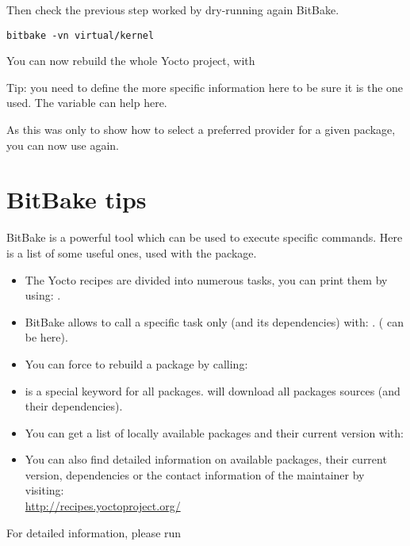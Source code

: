 Then check the previous step worked by dry-running again BitBake.
\begin{verbatim}
bitbake -vn virtual/kernel
\end{verbatim}

You can now rebuild the whole Yocto project, with 

Tip: you need to define the more specific information here to be sure it is the
one used. The  variable can help here.

As this was only to show how to select a preferred provider for a
given package, you can now use  again.

\section{BitBake tips}

BitBake is a powerful tool which can be used to execute specific commands. Here
is a list of some useful ones, used with the  package.

\begin{itemize}
  \item The Yocto recipes are divided into numerous tasks, you can print them
        by using: .
  \item BitBake allows to call a specific task only (and its dependencies)
        with: . ( can be
         here).
  \item You can force to rebuild a package by calling: 
  \item {} is a special keyword for all packages.  will download all packages sources (and their
        dependencies).
  \item You can get a list of locally available packages and their current
        version with: \\
  \item You can also find detailed information on available packages, their
        current version, dependencies or the contact information of the
        maintainer by visiting: \\
        \url{http://recipes.yoctoproject.org/}
\end{itemize}

For detailed information, please run 


